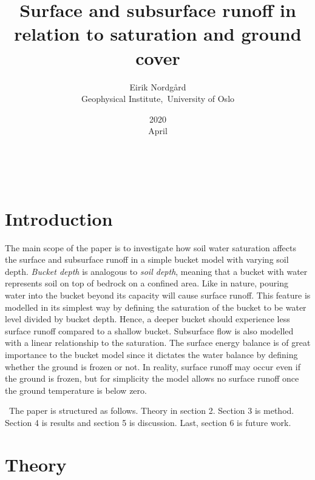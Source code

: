 \documentclass[a4paper,11pt,twocolumn]{article}
\begin{document}
\title{Surface and subsurface runoff in relation to saturation and ground cover}
\date{2020\\ April}
\author{Eirik Nordgård\\ Geophysical Institute,\ University of Oslo}


\
\section{Introduction}

The main scope of the paper is to investigate how soil water saturation affects the surface and subsurface runoff in a simple bucket model with varying soil depth. \textit{Bucket depth} is analogous to \textit{soil depth}, meaning that a bucket with water represents soil on top of bedrock on a confined area. Like in nature, pouring water into the bucket beyond its capacity will cause surface runoff. This feature is modelled in its simplest way by defining the saturation of the bucket to be water level divided by bucket depth. Hence, a deeper bucket should experience less surface runoff compared to a shallow bucket. Subsurface flow is also modelled with a linear relationship to the saturation. The surface energy balance is of great importance to the bucket model since it dictates the water balance by defining whether the ground is frozen or not. In reality, surface runoff may occur even if the ground is frozen, but for simplicity the model allows no surface runoff once the ground temperature is below zero. 

\
The paper is structured as follows. Theory in section 2. Section 3 is method. Section 4 is results and section 5 is discussion. Last, section 6 is future work. 
\
\section{Theory}
\end{document}
